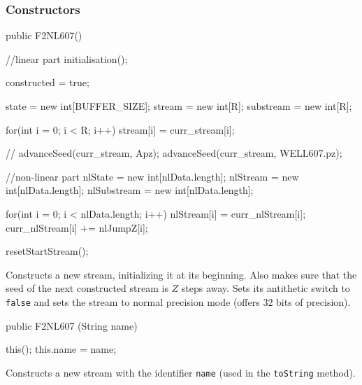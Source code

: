 \subsubsection* {Constructors}

\begin{code}
   public F2NL607() \begin{hide} {
      //linear part
      initialisation();

      constructed = true;

      state = new int[BUFFER_SIZE];
      stream = new int[R];
      substream = new int[R];

      for(int i = 0; i < R; i++)
         stream[i] = curr_stream[i];

//    advanceSeed(curr_stream, Apz);
      advanceSeed(curr_stream, WELL607.pz);

      //non-linear part
      nlState = new int[nlData.length];
      nlStream = new int[nlData.length];
      nlSubstream = new int[nlData.length];

      for(int i = 0; i < nlData.length; i++) {
         nlStream[i] = curr_nlStream[i];
         curr_nlStream[i] += nlJumpZ[i];
      }

      resetStartStream();
   } \end{hide}
\end{code}
\begin{tabb} Constructs a new stream, initializing it at its beginning.
  Also makes sure that the seed of the next constructed stream is
  $Z$ steps away. Sets its antithetic switch to \texttt{false} and sets
  the stream to normal precision mode (offers 32 bits of precision).
\end{tabb}
\begin{code}

   public F2NL607 (String name) \begin{hide} {
      this();
      this.name = name;
   }\end{hide}
\end{code}
\begin{tabb} Constructs a new stream with the identifier \texttt{name}
  (used in the \texttt{toString} method).
\end{tabb}
\begin{htmlonly}
\end{htmlonly}
